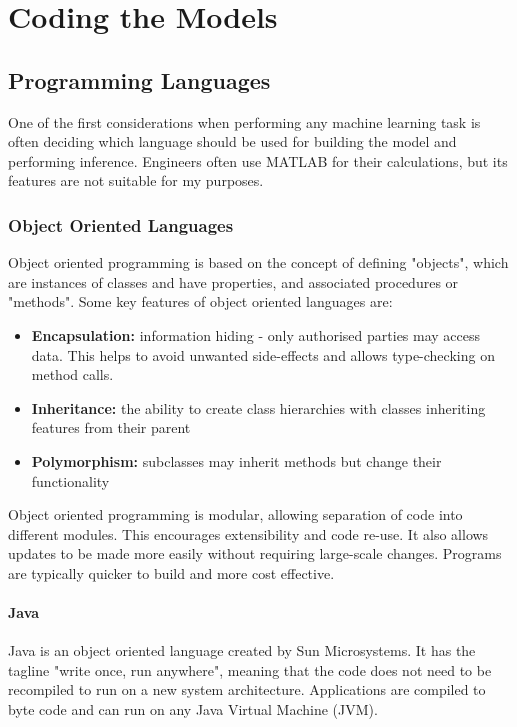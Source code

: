 \chapter{Coding the Models}

\section{Programming Languages}

One of the first considerations when performing any machine learning task is often deciding which language should be used for building the model and performing inference. Engineers often use MATLAB for their calculations, but its features are not suitable for my purposes.

\subsection{Object Oriented Languages}

Object oriented programming is based on the concept of defining "objects", which are instances of classes and have properties, and associated procedures or "methods". Some key features of object oriented languages are:

\begin{itemize}

\item \textbf{Encapsulation:} information hiding - only authorised parties may access data. This helps to avoid unwanted side-effects and allows type-checking on method calls.
\item \textbf{Inheritance:} the ability to create class hierarchies with classes inheriting features from their parent
\item \textbf{Polymorphism:} subclasses may inherit methods but change their functionality

\end{itemize}

Object oriented programming is modular, allowing separation of code into different modules. This encourages extensibility and code re-use. It also allows updates to be made more easily without requiring large-scale changes. Programs are typically quicker to build and more cost effective.

\subsubsection{Java}

Java is an object oriented language created by Sun Microsystems. It has the tagline "write once, run anywhere", meaning that the code does not need to be recompiled to run on a new system architecture. Applications are compiled to byte code and can run on any Java Virtual Machine (JVM).

